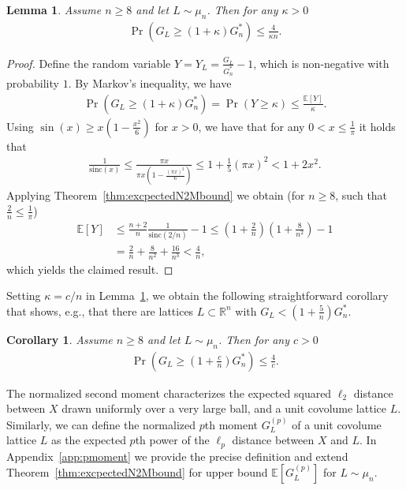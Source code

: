 \documentclass[article,doublecolumn]{IEEEtran}
\newcommand{\EE}{{\mathbb{E}}}
\newcommand{\R}{{\mathbb{R}}}
\newcommand{\sinc}{{\mathrm{sinc}}}
\newtheorem{lem}[thm]{Lemma}
\newtheorem{cor}[thm]{Corollary}
\begin{document}
\begin{lem}
Assume $n\geq 8$ and let $L\sim\mu_n$. Then for any $\kappa>0$
\begin{align}
\Pr\left(G_L\geq(1+\kappa) G^*_{n} \right)\leq \frac{4}{ \kappa n}.    
\end{align}  
\label{lem:Markov2}
\end{lem}

\begin{proof}
Define the random variable $Y=Y_L=\frac{G_L}{G^*_{n}}-1$, which is non-negative with probability $1$.
By Markov's inequality, we have    
\begin{align}
\Pr\left(G_L\geq(1+\kappa) G^*_{n} \right)=\Pr(Y\geq \kappa)\leq\frac{\EE[Y]}{\kappa}.    
\end{align}
Using $\sin(x)\geq x(1-\frac{x^2}{6})$ for $x>0$, we have that for any $0<x\leq \frac{1}{\pi}$ it holds that
\begin{align}
\frac{1}{\sinc(x)}\leq\frac{\pi x}{\pi x(1-\frac{(\pi x)^2}{6})}\leq 1+\frac{1}{5}(\pi x)^2<1+2x^2.   
\end{align}
Applying Theorem~\ref{thm:excpectedN2Mbound} we obtain (for $n\geq 8$, such that $\frac{2}{n}\leq\frac{1}{\pi}$)
\begin{align}
\EE[Y]&\leq \frac{n+2}{n}\frac{1}{\sinc(2/n)}-1\leq \left(1+\frac{2}{n}\right)\left(1+\frac{8}{n^2}\right) -1\nonumber\\
&=\frac{2}{n}+\frac{8}{n^2}+\frac{16}{n^3}<\frac{4}{n},
\end{align}
which yields the claimed result.
\end{proof}

Setting $\kappa=c/n$ in Lemma~\ref{lem:Markov2}, we obtain the following straightforward corollary that shows, e.g., that there are lattices $L\subset \R^n$ with $G_L<\left(1+\frac{5}{n}\right)G_n^*$.
\begin{cor}
Assume $n\geq 8$ and let $L\sim\mu_n$. Then for any $c>0$
\begin{align}
\Pr\left(G_L\geq\left(1+\frac{c}{n}\right) G^*_{n} \right)\leq \frac{4}{c}.    
\end{align}  
\label{cor:Markov3}
\end{cor}


The normalized second moment characterizes the expected squared $\ell_2$ distance between $X$ drawn uniformly over a very large ball, and a unit covolume lattice $L$. Similarly, we can define the normalized $p$th moment $G_L^{(p)}$ of a unit covolume lattice $L$ as the expected $p$th power of the $\ell_p$ distance between $X$ and $L$. In Appendix~\ref{app:pmoment} we provide the precise definition and extend Theorem~\ref{thm:excpectedN2Mbound} for upper bound $\EE[G_L^{(p)}]$ for $L\sim\mu_n$.
\end{document}

